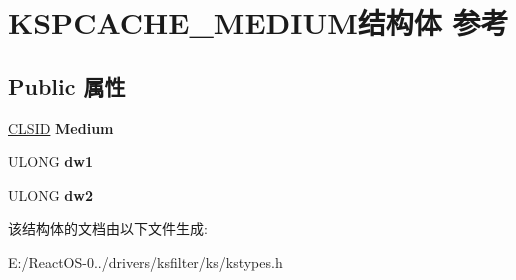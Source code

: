 \hypertarget{struct_k_s_p_c_a_c_h_e___m_e_d_i_u_m}{}\section{K\+S\+P\+C\+A\+C\+H\+E\+\_\+\+M\+E\+D\+I\+U\+M结构体 参考}
\label{struct_k_s_p_c_a_c_h_e___m_e_d_i_u_m}
\subsection*{Public 属性}
\begin{DoxyCompactItemize}
\item 
\mbox{\label{struct_k_s_p_c_a_c_h_e___m_e_d_i_u_m_ac29e3ef9b1d28cfb3179c8d7e3f330d2}} 
\hyperlink{struct___i_i_d}{C\+L\+S\+ID} {\bfseries Medium}
\item 
\mbox{\label{struct_k_s_p_c_a_c_h_e___m_e_d_i_u_m_a052fad6214e773341ca0a65e9ddc0575}} 
U\+L\+O\+NG {\bfseries dw1}
\item 
\mbox{\label{struct_k_s_p_c_a_c_h_e___m_e_d_i_u_m_aa770698e4aaf0a5eb32ff27ff1bab5ee}} 
U\+L\+O\+NG {\bfseries dw2}
\end{DoxyCompactItemize}


该结构体的文档由以下文件生成\+:\begin{DoxyCompactItemize}
\item 
E\+:/\+React\+O\+S-\/0../drivers/ksfilter/ks/kstypes.\+h\end{DoxyCompactItemize}
